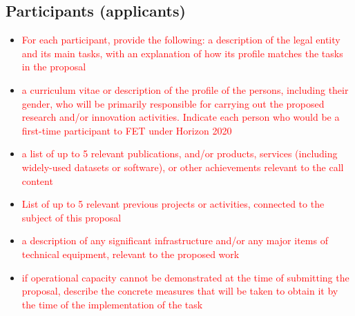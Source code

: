 \documentclass[11pt, a4paper]{article} %
\begin{document}
 \subsection{Participants (applicants)}

 \begin{itemize}
 \item \textcolor{red}{For each participant, provide the following: a
     description of the legal entity and its main tasks, with an
     explanation of how its profile matches the tasks in the proposal}
 \item \textcolor{red}{a curriculum vitae or description of the
     profile of the persons, including their gender, who will be
     primarily responsible for carrying out the proposed research
     and/or innovation activities. Indicate each person who would be a
     first-time participant to FET under Horizon 2020}
\item \textcolor{red}{a list of up to 5 relevant publications, and/or
    products, services (including widely-used datasets or software),
    or other achievements relevant to the call content}
\item \textcolor{red}{List of up to 5 relevant previous projects or
    activities, connected to the subject of this proposal}
 \item \textcolor{red}{a description of any significant infrastructure
     and/or any major items of technical equipment, relevant to the
     proposed work}
 \item \textcolor{red}{if operational capacity cannot be demonstrated
     at the time of submitting the proposal, describe the concrete
     measures that will be taken to obtain it by the time of the
     implementation of the task}
 \end{itemize}
\end{document}
